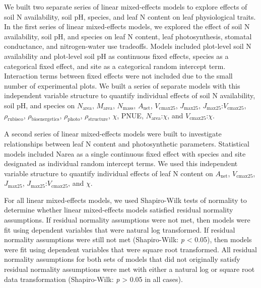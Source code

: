     We built two separate series of linear mixed-effects models to explore effects of soil N availability, soil pH, species, and leaf N content on leaf physiological traits. In the first series of linear mixed-effects models, we explored the effect of soil N availability, soil pH, and species on leaf N content, leaf photosynthesis, stomatal conductance, and nitrogen-water use tradeoffs. Models included plot-level soil N availability and plot-level soil pH as continuous fixed effects, species as a categorical fixed effect, and site as a categorical random intercept term. Interaction terms between fixed effects were not included due to the small number of experimental plots. We built a series of separate models with this independent variable structure to quantify individual effects of soil N availability, soil pH, and species on $N_\mathrm{area}$, $M_\mathrm{area}$, $N_\mathrm{mass}$, $A_\mathrm{net}$, $V_\mathrm{cmax25}$, $J_\mathrm{max25}$, $J_\mathrm{max25}$:$V_\mathrm{cmax25}$, $\rho_\mathrm{rubisco}$, $\rho_\mathrm{bioenergetics}$, $\rho_\mathrm{photo}$, $\rho_\mathrm{structure}$, $\chi$, PNUE, $N_{\mathrm{area}}$:$\chi$, and $V_{\mathrm{cmax25}}$:$\chi$.

    A second series of linear mixed-effects models were built to investigate relationships between leaf N content and photosynthetic parameters. Statistical models included Narea as a single continuous fixed effect with species and site designated as individual random intercept terms. We used this independent variable structure to quantify individual effects of leaf N content on $A_\mathrm{net}$, $V_\mathrm{cmax25}$, $J_\mathrm{max25}$, $J_\mathrm{max25}$:$V_\mathrm{cmax25}$, and $\chi$.

    For all linear mixed-effects models, we used Shapiro-Wilk tests of normality to determine whether linear mixed-effects models satisfied residual normality assumptions. If residual normality assumptions were not met, then models were fit using dependent variables that were natural log transformed. If residual normality assumptions were still not met (Shapiro-Wilk: \textit{p} < 0.05), then models were fit using dependent variables that were square root transformed. All residual normality assumptions for both sets of models that did not originally satisfy residual normality assumptions were met with either a natural log or square root data transformation (Shapiro-Wilk: \textit{p} > 0.05 in all cases).

